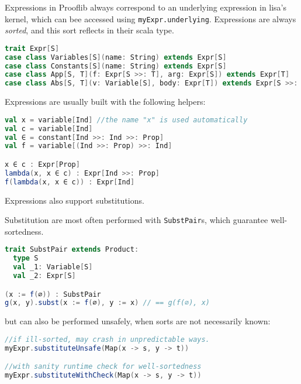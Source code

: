 \begin{definition}[Expressions]
  Expressions in Prooflib always correspond to an underlying expression in lisa's kernel, which can bee accessed using \lstinline|myExpr.underlying|. Expressions are always \textit{sorted}, and this sort reflects in their scala type.
  \begin{lstlisting}[language=scala]
trait Expr[S]
case class Variables[S](name: String) extends Expr[S]
case class Constants[S](name: String) extends Expr[S]
case class App[S, T](f: Expr[S >>: T], arg: Expr[S]) extends Expr[T]
case class Abs[S, T](v: Variable[S], body: Expr[T]) extends Expr[S >>: T]
  \end{lstlisting}
\end{definition}
\noindent
Expressions are usually built with the following helpers:
\begin{example}\phantom{.}

  \begin{lstlisting}[language=scala]
val x = variable[Ind] //the name "x" is used automatically
val c = variable[Ind]
val ∈ = constant[Ind >>: Ind >>: Prop]
val f = variable[(Ind >>: Prop) >>: Ind]

x ∈ c : Expr[Prop]
lambda(x, x ∈ c) : Expr[Ind >>: Prop]
f(lambda(x, x ∈ c)) : Expr[Ind]
  \end{lstlisting}

\end{example}

Expressions also support substitutions.

\begin{definition}[Substitution]\phantom{.}
  Substitution are most often performed with \lstinline|SubstPair|s, which guarantee well-sortedness.
  \begin{lstlisting}[language=scala]
trait SubstPair extends Product:
  type S
  val _1: Variable[S]
  val _2: Expr[S]

(x := f(∅)) : SubstPair
g(x, y).subst(x := f(∅), y := x) // == g(f(∅), x)
  \end{lstlisting}
  \noindent
  but can also be performed unsafely, when sorts are not necessarily known:
  \begin{lstlisting}[language=scala]
//if ill-sorted, may crash in unpredictable ways.
myExpr.substituteUnsafe(Map(x -> s, y -> t))

//with sanity runtime check for well-sortedness
myExpr.substituteWithCheck(Map(x -> s, y -> t))
  \end{lstlisting}
\end{definition}

